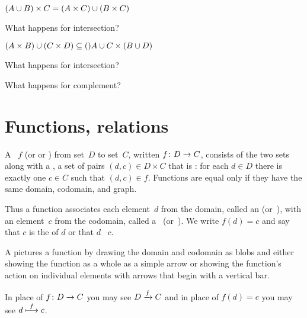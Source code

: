 \documentclass{ibl}
\begin{document}
\begin{ex} 
\begin{exes}
\item $(A\cup B)\times C=(A\times C)\cup(B\times C)$
\item What happens for intersection?
\item $(A\times B)\cup (C\times D)\subseteq ()A\cup C\times (B\cup D)$
\item What happens for intersection?
\item What happens for complement?
\end{exes}
\end{ex}











\chapter{Functions, relations}
\begin{df}
A ~$f$ (or  or ) 
from  set~$D$
to  set~$C$, written $\mbox{$f\colon D\to C$}$,
consists of the two sets along with a , 
a set of pairs $(d,c)\in D\times C$ that is 
: for each $d\in D$ there is
exactly one $c\in C$ such that $(d,c)\in f$. 
Functions are equal only if they have the same domain, codomain,
and graph.

Thus a function associates each element~$d$ from the domain,
called an  (or~),
with an element~$c$ from the codomain, 
called a~ (or~). 
We write $f(d)=c$ and say that $c$ is the  of $d$ 
or that $d$ ~$c$.
\end{df}

A  pictures a function by drawing the domain and 
codomain as blobs and 
either showing the function as a whole as a simple arrow   
or showing the function's action on individual elements 
with arrows that begin with a vertical bar.
\begin{center}
  \hspace{8em}
\end{center}
In place of $\mbox{$f\colon D\to C$}$ you may see $D\xrightarrow{f} C$ and
in place of $f(d)=c$ you may see $d\stackrel{f}{\longmapsto}c$.
\end{document}
